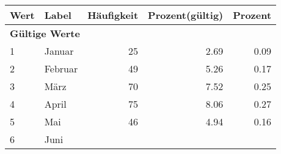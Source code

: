      \begin{longtable}{lXrrr}
     \toprule
     \textbf{Wert} & \textbf{Label} & \textbf{Häufigkeit} & \textbf{Prozent(gültig)} & \textbf{Prozent} \\
     \endhead
     \midrule
     \multicolumn{5}{l}{\textbf{Gültige Werte}}\\

     1 &
     \multicolumn{1}{X}{ Januar   } &


       \num{25} &
       \num[round-mode=places,round-precision=2]{2.69} &
         \num[round-mode=places,round-precision=2]{0.09} \\

     2 &
     \multicolumn{1}{X}{ Februar   } &


       \num{49} &
       \num[round-mode=places,round-precision=2]{5.26} &
         \num[round-mode=places,round-precision=2]{0.17} \\

     3 &
     \multicolumn{1}{X}{ März   } &


       \num{70} &
       \num[round-mode=places,round-precision=2]{7.52} &
         \num[round-mode=places,round-precision=2]{0.25} \\

     4 &
     \multicolumn{1}{X}{ April   } &


       \num{75} &
       \num[round-mode=places,round-precision=2]{8.06} &
         \num[round-mode=places,round-precision=2]{0.27} \\

     5 &
     \multicolumn{1}{X}{ Mai   } &


       \num{46} &
       \num[round-mode=places,round-precision=2]{4.94} &
         \num[round-mode=places,round-precision=2]{0.16} \\

     6 &
     \multicolumn{1}{X}{ Juni   } &



\end{longtable}
